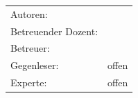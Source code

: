 \begin{titlepage}
\begin{center}
	\vspace{5ex}
	\begin{framed}
		\timeperiod
	\end{framed}
\end{center}

\vspace{11ex}
\begin{tabular}{ll} %
	Autoren:         		& \authors    	\\
	Betreuender Dozent:		& \advisorprof  	\\
	Betreuer:        		& \advisor    	\\
	Gegenleser:      		& offen  		\\
	Experte:      			& offen  		\\
\end{tabular}

\end{titlepage}

\restoregeometry %
